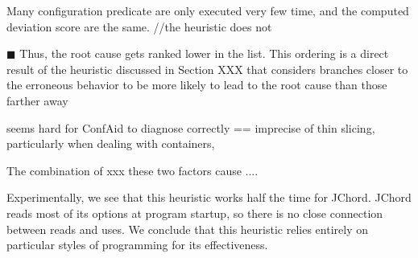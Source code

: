 Many configuration predicate are only executed very few time, and the computed deviation score are the same.
//the heuristic does not


$\blacksquare$
Thus, the root cause gets
ranked lower in the list. This ordering is a direct result
of the heuristic discussed in Section XXX that considers
branches closer to the erroneous behavior to be more
likely to lead to the root cause than those farther away

seems hard for ConfAid to diagnose correctly
== imprecise of thin slicing, particularly when dealing with containers,

The combination of xxx these two factors cause ....


Experimentally, we see that this heuristic works half the time for JChord.
JChord reads most of its options at program startup,
so there is no close connection between reads and uses. We
conclude that this heuristic relies entirely on particular styles
of programming for its effectiveness.


